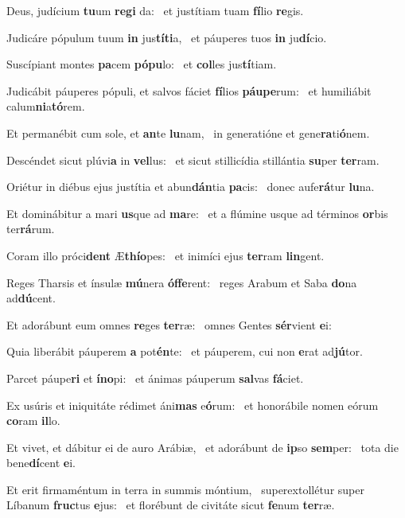 \item Deus, judícium \textbf{tu}um \textbf{re}\textbf{gi} da:~\psstar{} et justítiam tuam \textbf{fí}lio \textbf{re}gis.
\item Judicáre pópulum tuum \textbf{in} jus\textbf{tí}\textbf{ti}a,~\psstar{} et páuperes tuos \textbf{in} ju\textbf{dí}cio.
\item Suscípiant montes \textbf{pa}cem \textbf{pó}\textbf{pu}lo:~\psstar{} et \textbf{col}les jus\textbf{tí}tiam.
\item Judicábit páuperes pópuli, et salvos fáciet \textbf{fí}lios \textbf{páu}\textbf{pe}rum:~\psstar{} et humiliábit calum\textbf{ni}a\textbf{tó}rem.
\item Et permanébit cum sole, et \textbf{an}te \textbf{lu}nam,~\psstar{} in generatióne et gene\textbf{ra}ti\textbf{ó}nem.
\item Descéndet sicut plúvi\textbf{a} in \textbf{vel}lus:~\psstar{} et sicut stillicídia stillántia \textbf{su}per \textbf{ter}ram.
\item Oriétur in diébus ejus justítia et abun\textbf{dán}tia \textbf{pa}cis:~\psstar{} donec aufe\textbf{rá}tur \textbf{lu}na.
\item Et dominábitur a mari \textbf{us}que ad \textbf{ma}re:~\psstar{} et a flúmine usque ad términos \textbf{or}bis ter\textbf{rá}rum.
\item Coram illo próci\textbf{dent} Æ\textbf{thí}\textbf{o}pes:~\psstar{} et inimíci ejus \textbf{ter}ram \textbf{lin}gent.
\item Reges Tharsis et ínsulæ \textbf{mú}nera \textbf{óf}\textbf{fe}rent:~\psstar{} reges Arabum et Saba \textbf{do}na ad\textbf{dú}cent.
\item Et adorábunt eum omnes \textbf{re}ges \textbf{ter}ræ:~\psstar{} omnes Gentes \textbf{sér}vient \textbf{e}i:
\item Quia liberábit páuperem \textbf{a} pot\textbf{én}te:~\psstar{} et páuperem, cui non \textbf{e}rat ad\textbf{jú}tor.
\item Parcet páupe\textbf{ri} et \textbf{ín}\textbf{o}pi:~\psstar{} et ánimas páuperum \textbf{sal}vas \textbf{fá}ciet.
\item Ex usúris et iniquitáte rédimet áni\textbf{mas} e\textbf{ó}rum:~\psstar{} et honorábile nomen eórum \textbf{co}ram \textbf{il}lo.
\item Et vivet, et dábitur ei de auro Arábiæ,~\pscross{} et adorábunt de \textbf{ip}so \textbf{sem}per:~\psstar{} tota die bene\textbf{dí}cent \textbf{e}i.
\item Et erit firmaméntum in terra in summis móntium,~\pscross{} superextollétur super Líbanum \textbf{fruc}tus \textbf{e}jus:~\psstar{} et florébunt de civitáte sicut \textbf{fe}num \textbf{ter}ræ.

